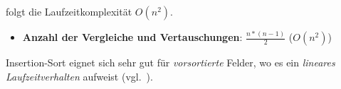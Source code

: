 folgt die Laufzeitkomplexität $O(n^2)$.\\

\begin{itemize}
    \item \textbf{Anzahl der Vergleiche und Vertauschungen}: $\frac{n * ( n - 1)}{2}$ ($O(n^2)$)
\end{itemize}


\begin{tcolorbox}[title={Lineares Laufzeitverhalten}]
    Insertion-Sort eignet  sich sehr gut für \textit{vorsortierte} Felder, wo es ein \textit{lineares Laufzeitverhalten} aufweist (vgl.~\cite[188]{CL22}).
\end{tcolorbox}


